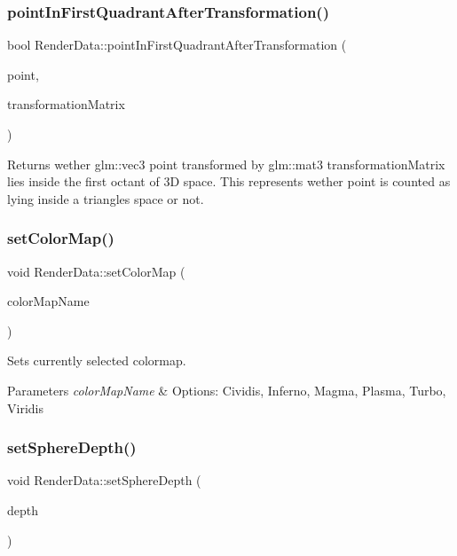\subsubsection{\texorpdfstring{point\+In\+First\+Quadrant\+After\+Transformation()}{pointInFirstQuadrantAfterTransformation()}}
{\footnotesize\ttfamily bool Render\+Data\+::point\+In\+First\+Quadrant\+After\+Transformation (\begin{DoxyParamCaption}\item[{const glm\+::vec3 \&}]{point,  }\item[{const glm\+::mat3 \&}]{transformation\+Matrix }\end{DoxyParamCaption})\hspace{0.3cm}{\ttfamily [private]}}

\begin{DoxyReturn}{Returns}
wether glm\+::vec3 point transformed by glm\+::mat3 transformation\+Matrix lies inside the first octant of 3D space. This represents wether point is counted as lying inside a triangle\textquotesingle{}s space or not. 
\end{DoxyReturn}
\mbox{\label{class_render_data_adb1961bf93370d67c9efb416fde8fefb}} 
\subsubsection{\texorpdfstring{set\+Color\+Map()}{setColorMap()}}
{\footnotesize\ttfamily void Render\+Data\+::set\+Color\+Map (\begin{DoxyParamCaption}\item[{Q\+String}]{color\+Map\+Name }\end{DoxyParamCaption})}

Sets currently selected colormap. 
\begin{DoxyParams}{Parameters}
{\em color\+Map\+Name} & Options\+: Cividis, Inferno, Magma, Plasma, Turbo, Viridis \\
\hline
\end{DoxyParams}
\mbox{\label{class_render_data_a8d5f7285d29dc9ca0f93fcf2b5826283}} 
\subsubsection{\texorpdfstring{set\+Sphere\+Depth()}{setSphereDepth()}}
{\footnotesize\ttfamily void Render\+Data\+::set\+Sphere\+Depth (\begin{DoxyParamCaption}\item[{short}]{depth }\end{DoxyParamCaption})}

